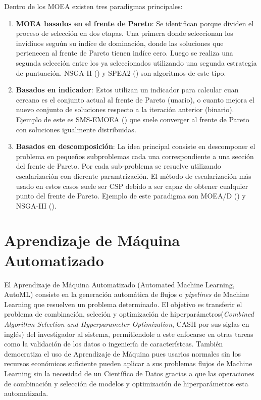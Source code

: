 Dentro de los MOEA existen tres paradigmas principales:
\begin{enumerate}
    \item \textbf{MOEA basados en el frente de Pareto}: Se identifican porque dividen el proceso de selecci\'on en dos etapas. Una primera donde seleccionan los invidiuos segu\'un su ind\'ice de dominaci\'on, donde las soluciones que pertenecen al frente de Pareto tienen ind\'ice cero. Luego se realiza una segunda selecci\'on entre los ya seleccionados utilizando una segunda estrategia de puntuaci\'on. NSGA-II (\cite{deb2002fast}) y SPEA2 (\cite{zitzler1999multiobjective}) son algoritmos de este tipo.

    \item \textbf{Basados en indicador}: Estos utilizan un indicador para calcular cuan cercano es el conjunto actual al frente de Pareto (unario), o cuanto mejora el nuevo conjunto de soluciones respecto a la iteraci\'on anterior (binario). Ejemplo de este es SMS-EMOEA (\cite{emmerich2005emo}) que suele converger al frente de Pareto con soluciones igualmente distribuidas.

    \item \textbf{Basados en descomposici\'on}: La idea principal consiste en descomponer el problema en pequeños subproblemas cada una correspondiente a una secci\'on del frente de Pareto. Por cada sub-problema se resuelve utilizando escalarizaci\'on con dierente paramtrizaci\'on. El m\'etodo de escalarizaci\'on m\'as usado en estos casos suele ser CSP debido a ser capaz de obtener cualquier punto del frente de Pareto. Ejemplo de este paradigma son MOEA/D (\cite{zhang2007moea}) y NSGA-III (\cite{deb2013evolutionary}).
\end{enumerate}


\section{Aprendizaje de M\'aquina Automatizado}
El Aprendizaje de M\'aquina Automatizado (Automated Machine Learning, AutoML) consiste en la generaci\'on autom\'atica de flujos o \textit{pipelines} de Machine Learning que resuelven un problema determinado. El objetivo es transferir el problema de combinaci\'on, selcci\'on y optimizaci\'on de hiperpar\'ametros(\textit{Combined Algorithm Selection and Hyperparameter Optimization}, CASH por sus siglas en ingl\'es) del investigador al sistema, permitiendole a este enfocarse en otras tareas como la validaci\'on de los datos o ingenier\'ia de caracter\'istcas. Tambi\'en democratiza el uso de Aprendizaje de M\'aquina pues usarios normales sin los recursos econ\'omicos suficiente pueden aplicar a sus problemas flujos de Machine Learning sin la necesidad de un Cient\'ifico de Datos gracias a que las operaciones de combinaci\'on y selecci\'on de modelos y optimizaci\'on de hiperpar\'ametros esta automatizada.

